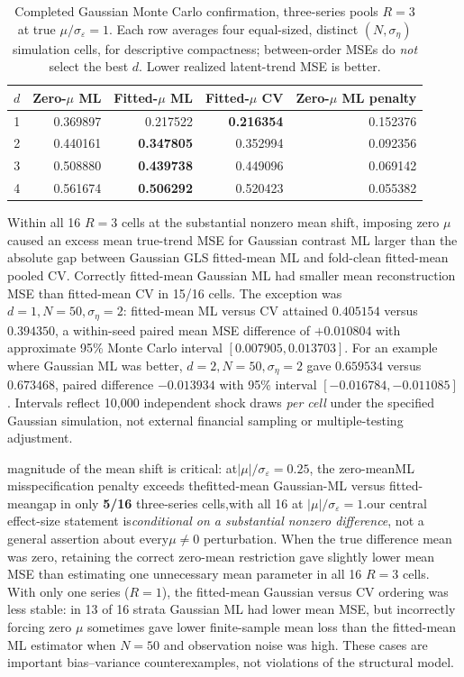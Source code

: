 \documentclass[11pt]{article}
\begin{document}
\begin{table}[ht]
\centering
\caption{Completed Gaussian Monte Carlo confirmation,
three-series pools $R=3$ at true
$\mu/\sigma_\varepsilon=1$. Each row
averages four equal-sized, distinct
$(N,\sigma_\eta)$ simulation cells, for
descriptive compactness; between-order
MSEs do \emph{not} select the best $d$.
Lower realized latent-trend MSE is better.}
\label{tab:multorder-gaussian-confirmation}
\begin{tabular}{rrrrr}
\toprule
$d$ & Zero-$\mu$ ML & Fitted-$\mu$ ML &
Fitted-$\mu$ CV & Zero-$\mu$ ML penalty\\
\midrule
1 & 0.369897 & 0.217522 & \textbf{0.216354} & 0.152376\\
2 & 0.440161 & \textbf{0.347805} & 0.352994 & 0.092356\\
3 & 0.508880 & \textbf{0.439738} & 0.449096 & 0.069142\\
4 & 0.561674 & \textbf{0.506292} & 0.520423 & 0.055382\\
\bottomrule
\end{tabular}
\end{table}

Within all 16 $R=3$ cells at the substantial
nonzero mean shift, imposing zero $\mu$
caused an excess mean true-trend MSE for
Gaussian contrast ML larger than the
absolute gap between Gaussian GLS fitted-mean
ML and fold-clean fitted-mean pooled CV.
Correctly fitted-mean Gaussian ML had smaller
mean reconstruction MSE than fitted-mean CV
in 15/16 cells. The exception was
$d=1,N=50,\sigma_\eta=2$:
fitted-mean ML versus CV attained
$0.405154$ versus $0.394350$, a within-seed
paired mean MSE difference of $+0.010804$
with approximate 95\% Monte Carlo interval
$[0.007905,0.013703]$. For an example where
Gaussian ML was better,
$d=2,N=50,\sigma_\eta=2$ gave
$0.659534$ versus $0.673468$, paired difference
$-0.013934$ with 95\% interval
$[-0.016784,-0.011085]$.
Intervals reflect 10,000 independent
shock draws \emph{per cell} under the specified
Gaussian simulation, not external
financial sampling or multiple-testing
adjustment.

\nThe magnitude of the mean shift is critical: at\n$|\mu|/\sigma_\varepsilon=0.25$, the zero-mean\nGaussian ML misspecification penalty exceeds the\nabsolute fitted-mean Gaussian-ML versus fitted-mean\nCV gap in only \textbf{5/16} three-series cells,\ncompared with all 16 at $|\mu|/\sigma_\varepsilon=1$.\nConsequently our central effect-size statement is\n\emph{conditional on a substantial nonzero difference\nmean}, not a general assertion about every\n$\mu\ne0$ perturbation.\n
When the true difference mean was zero,
retaining the correct zero-mean restriction
gave slightly lower mean MSE than
estimating one unnecessary mean parameter
in all 16 $R=3$ cells. With only one series
($R=1$), the fitted-mean Gaussian versus
CV ordering was less stable: in 13 of 16
strata Gaussian ML had lower mean MSE,
but incorrectly forcing zero $\mu$
sometimes gave lower finite-sample
mean loss than the fitted-mean ML
estimator when $N=50$ and
observation noise was high.
These cases are important
bias--variance counterexamples, not
violations of the structural model.
\end{document}
